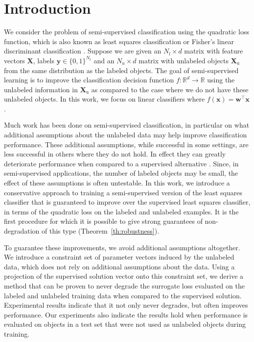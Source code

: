 \documentclass[twoside]{memoir}\usepackage[]{graphicx}\usepackage{xcolor}
\renewcommand{\vec}{\mathbf}
\begin{document}
\section{Introduction}
\label{Introduction}
We consider the problem of semi-supervised classification using the quadratic loss function, which is also known as least squares classification or Fisher's linear discriminant classification \citep{Hastie2009,Poggio2003}. Suppose we are given an $N_l \times d$ matrix with feature vectors $\vec{X}$, labels $\vec{y} \in \{0,1\}^{N_l}$ and an $N_u \times d$  matrix with unlabeled objects $\vec{X}_\text{u}$ from the same distribution as the labeled objects. The goal of semi-supervised learning is to improve the classification decision function $f: \mathbb{R}^d \to \mathbb{R}$ using the unlabeled information in $\vec{X}_\text{u}$ as compared to the case where we do not have these unlabeled objects. In this work, we focus on linear classifiers where $f(\vec{x})=\vec{w}^\top \vec{x}$. 

Much work has been done on semi-supervised classification, in particular on what additional assumptions about the unlabeled data may help improve classification performance. These additional assumptions, while successful in some settings, are less successful in others where they do not hold. In effect they can greatly deteriorate performance when compared to a supervised alternative \citep{Cozman2006}. Since, in semi-supervised applications, the number of labeled objects may be small, the effect of these assumptions is often untestable. In this work, we introduce a conservative approach to training a semi-supervised version of the least squares classifier that is guaranteed to improve over the supervised least squares classifier, in terms of the quadratic loss on the labeled and unlabeled examples. It is the first procedure for which it is possible to give strong guarantees of non-degradation of this type (Theorem~\ref{th:robustness}).

To guarantee these improvements, we avoid additional assumptions altogether. We introduce a constraint set of parameter vectors induced by the unlabeled data, which does not rely on additional assumptions about the data. Using a projection of the supervised solution vector onto this constraint set, we derive a method that can be proven to never degrade the surrogate loss evaluated on the labeled and unlabeled training data when compared to the supervised solution. Experimental results indicate that it not only never degrades, but often improves performance. Our experiments also indicate the results hold when performance is evaluated on objects in a test set that were not used as unlabeled objects during training.
\end{document}
